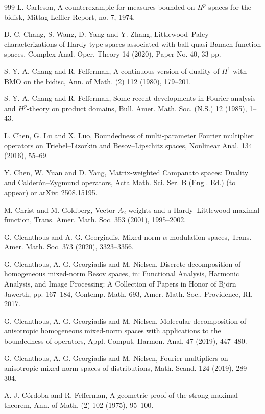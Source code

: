 \documentclass[11pt, reqno]{amsart}
\theoremstyle{definition}
\theoremstyle{remark}
\numberwithin{equation}{section}
\begin{document}
\begin{thebibliography}{999}
L. Carleson,
A counterexample for measures bounded on $H^p$
spaces for the bidisk,
Mittag-Leffler Report, no. 7, 1974.

D.-C. Chang, S. Wang, D. Yang and Y. Zhang,
Littlewood--Paley characterizations of Hardy-type spaces
associated with ball quasi-Banach function spaces,
Complex Anal. Oper. Theory 14 (2020), Paper No. 40, 33 pp.

S.-Y. A. Chang and R. Fefferman,
A continuous version of duality of $H^1$ with BMO on the bidisc,
Ann. of Math. (2) 112 (1980), 179--201.

S.-Y. A. Chang and R. Fefferman,
Some recent developments in Fourier analysis and $H^p$-theory on product domains,
Bull. Amer. Math. Soc. (N.S.) 12 (1985), 1--43.

L. Chen, G. Lu and X. Luo,
Boundedness of multi-parameter Fourier multiplier operators on
Triebel--Lizorkin and Besov--Lipschitz spaces,
Nonlinear Anal. 134 (2016), 55--69.

Y. Chen, W. Yuan and D. Yang,
Matrix-weighted Campanato spaces: Duality and Calder\'on--Zygmund operators,
Acta Math. Sci. Ser. B (Engl. Ed.) (to appear) or arXiv: 2508.15195.

M. Christ and M. Goldberg,
Vector $A_2$ weights and a Hardy--Littlewood maximal function,
Trans. Amer. Math. Soc. 353 (2001), 1995--2002.

G. Cleanthous and A. G. Georgiadis,
Mixed-norm $\alpha$-modulation spaces,
Trans. Amer. Math. Soc. 373 (2020), 3323--3356.

G. Cleanthous, A. G. Georgiadis and M. Nielsen,
Discrete decomposition of homogeneous mixed-norm Besov spaces,
in: Functional Analysis, Harmonic Analysis, and Image Processing:
A Collection of Papers in Honor of Bj\"orn Jawerth, pp. 167--184,
Contemp. Math. 693, Amer. Math. Soc., Providence, RI, 2017.

G. Cleanthous, A. G. Georgiadis and M. Nielsen,
Molecular decomposition of anisotropic homogeneous mixed-norm spaces with
applications to the boundedness of operators,
Appl. Comput. Harmon. Anal. 47 (2019), 447--480.

G. Cleanthous, A. G. Georgiadis and M. Nielsen,
Fourier multipliers on anisotropic mixed-norm spaces of distributions,
Math. Scand. 124 (2019), 289--304.

A. J. C\'ordoba and R. Fefferman,
A geometric proof of the strong maximal theorem,
Ann. of Math. (2) 102 (1975), 95--100.


\end{thebibliography}
\end{document}
